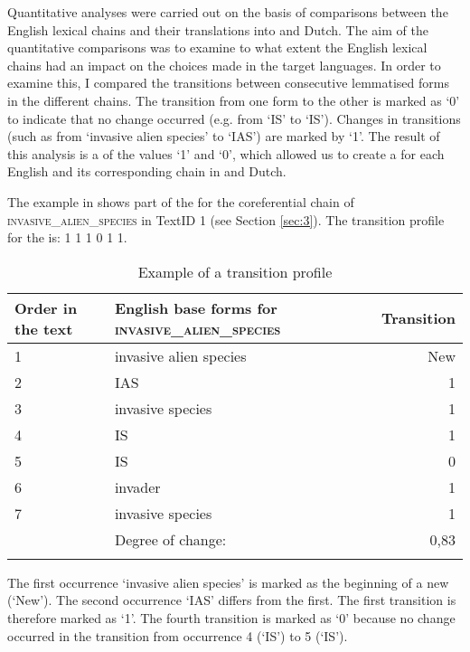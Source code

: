 \documentclass[output=paper]{langsci/langscibook.cls}
\begin{document}
Quantitative analyses were carried out on the basis of comparisons between the 
English lexical chains and their translations into  and Dutch. The aim of 
the quantitative comparisons was to examine to what extent the English lexical 
chains had an impact on the choices made in the target languages. In order to examine 
this, I compared the transitions between consecutive lemmatised forms in the different 
chains. The transition from one form to the other is marked as `0' to indicate 
that no change occurred (e.g. from `IS' to `IS'). Changes in transitions (such as 
from `invasive alien species' to `IAS') are marked by `1'. The result of this 
analysis is a  of the values `1' and `0', which allowed us to create a 
 for each English  and its corresponding 
chain in  and Dutch. 

The example in  shows part of the  for the coreferential 
chain of \textsc{invasive\_alien\_species} in TextID 1 (see Section \ref{sec:3}). The transition 
profile for the  is: 1 1 1 0 1 1.

\begin{table} 
		\begin{tabular}{p{1.5cm}lr}
\lsptoprule
\textbf{Order in the text} & \textbf{English base forms for} \textsc{invasive\_alien\_species} & \textbf{Transition}\\
\midrule
1 & invasive alien species & New\\
2 & IAS & 1 \\
3 & invasive species & 1\\
4 & IS & 1 \\
5 & IS & 0 \\
6 & invader & 1 \\
7 & invasive species & 1 \\
\midrule
 & Degree of change: & 0,83\\
\lspbottomrule
\end{tabular}
\caption{Example of a transition profile}
\label{tab:5}
\end{table}

The first occurrence `invasive alien species' is  marked as the beginning of a new  (`New'). The 
second occurrence `IAS' differs from the first. The first transition is therefore 
marked as `1'. The fourth transition is marked as `0' because no change occurred 
in the transition from occurrence 4 (`IS') to 5 (`IS').
\end{document}
